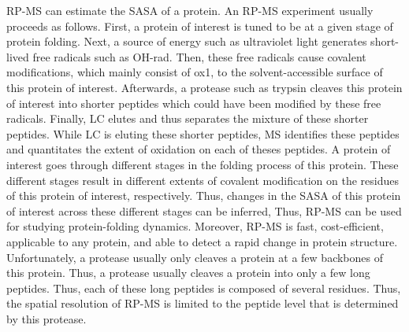 \Gls{RP-MS} can estimate the \gls{SASA} of a protein.
An \gls{RP-MS} experiment usually proceeds as follows.
First, a protein of interest is tuned to be at a given stage of protein folding.
Next, a source of energy such as ultraviolet light generates short-lived free radicals such as \gls{OH-rad}.{}
Then, these free radicals cause covalent modifications, which mainly consist of \gls{ox1}, to the solvent-accessible surface of this protein of interest.
Afterwards, a protease such as trypsin cleaves this protein of interest into shorter peptides which could have been modified by these free radicals.
Finally, \gls{LC} elutes and thus separates the mixture of these shorter peptides.{}
While \gls{LC} is eluting these shorter peptides, \gls{MS} identifies these peptides and quantitates the extent of oxidation on each of theses peptides.
A protein of interest goes through different stages in the folding process of this protein.
These different stages result in different extents of covalent modification on the residues of this protein of interest, respectively.
Thus, changes in the \gls{SASA} of this protein of interest across these different stages can be inferred,
Thus, \gls{RP-MS} can be used for studying protein-folding dynamics.
Moreover, \gls{RP-MS} is fast, cost-efficient, applicable to any protein, and able to detect a rapid change in protein structure.
Unfortunately, a protease usually only cleaves a protein at a few backbones of this protein. %
Thus, a protease usually cleaves a protein into only a few long peptides.
Thus, each of these long peptides is composed of several residues.
Thus, the spatial resolution of \gls{RP-MS} is limited to the peptide level that is determined by this protease.
